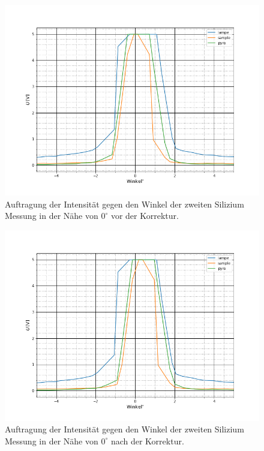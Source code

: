 \begin{figure}
	\includegraphics[scale=0.5]{Bilder/anhang/winkelkorrektur_vorher}
	\centering
	\caption[Mittelpunkt der 2. Si Messung vor Winkelkorrektur]{\small Auftragung der Intensität gegen den Winkel der zweiten Silizium Messung in der Nähe von $0^\circ$ vor der Korrektur.}
\end{figure}
\begin{figure}
	\includegraphics[scale=0.5]{Bilder/anhang/winkelkorrektur_nachher}
	\centering
	\caption[Mittelpunkt der 2. Si Messung vor Winkelkorrektur]{\small Auftragung der Intensität gegen den Winkel der zweiten Silizium Messung in der Nähe von $0^\circ$ nach der Korrektur.}
\end{figure}
